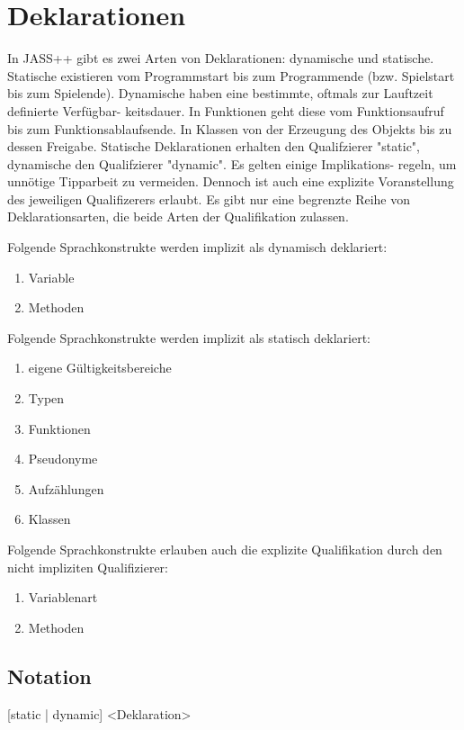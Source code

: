 \chapter{Deklarationen}
In JASS++ gibt es zwei Arten von Deklarationen: dynamische und statische. Statische existieren vom Programmstart bis zum
Programmende (bzw. Spielstart bis zum Spielende). Dynamische haben eine bestimmte, oftmals zur Lauftzeit definierte Verfügbar-
keitsdauer.
In Funktionen geht diese vom Funktionsaufruf bis zum Funktionsablaufsende. In Klassen von der Erzeugung des Objekts bis zu
dessen Freigabe.
Statische Deklarationen erhalten den Qualifzierer "static", dynamische den Qualifzierer "dynamic". Es gelten einige Implikations-
regeln, um unnötige Tipparbeit zu vermeiden. Dennoch ist auch eine explizite Voranstellung des jeweiligen Qualifizerers erlaubt.
Es gibt nur eine begrenzte Reihe von Deklarationsarten, die beide Arten der Qualifikation zulassen.

Folgende Sprachkonstrukte werden implizit als dynamisch deklariert:
\begin{enumerate}
\item Variable
\item Methoden
\end{enumerate}

Folgende Sprachkonstrukte werden implizit als statisch deklariert:
\begin{enumerate}
\item eigene Gültigkeitsbereiche
\item Typen
\item Funktionen
\item Pseudonyme
\item Aufzählungen
\item Klassen
\end{enumerate}

Folgende Sprachkonstrukte erlauben auch die explizite Qualifikation durch den nicht impliziten Qualifizierer:
\begin{enumerate}
\item Variablenart
\item Methoden
\end{enumerate}

\section{Notation}
[static | dynamic] <Deklaration>